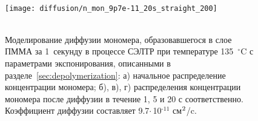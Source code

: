 \begin{figure}[H]
\begin{center}
		\vspace{-4em}  \vspace{2em} \\
		\texttt{[image: diffusion/n\_mon\_9p7e-11\_20s\_straight\_200]} \\
		\vspace{-4em}  \vspace{2em} \\
	\end{center}
	\vspace{-1.5em}
	\caption{Моделирование диффузии мономера, образовавшегося в слое ПММА за 1~секунду в процессе СЭЛТР при температуре 135~$^\circ$C с параметрами экспонирования, описанными в разделе~\ref{sec:depolymerization}: а) начальное распределение концентрации мономера; б), в), г) распределения концентрации мономера после диффузии в течение 1, 5 и 20 с соответственно. Коэффициент диффузии составляет 9.7\:$\cdot$\,10$^\text{-11}$ см$^\text{2}$/c.}
	\label{fig:diffusion_initial}
\end{figure}

\newpage

